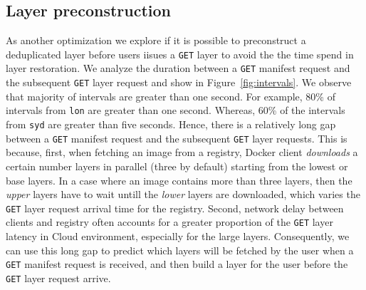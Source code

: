 \subsection{Layer preconstruction}

%
As another optimization we explore if it is possible to preconstruct a 
deduplicated layer before users iisues a \texttt{GET} layer to avoid the
the time spend in layer restoration.
%
We analyze the duration between a \texttt{GET} manifest request and the subsequent
\texttt{GET} layer request and show in Figure~\ref{fig:intervals}.
%
We observe that majority of intervals are greater than one second.
%
For example, 80\% of intervals from \texttt{lon} are greater than one second.
%
Whereas, 60\% of the intervals from \texttt{syd} are greater than five seconds. 
%
Hence, there is a relatively long gap
between a \texttt{GET} manifest request and the subsequent \texttt{GET}
layer requests.
%
This is because, first, when fetching an image from a registry,
Docker client \emph{downloads} a certain number layers in parallel (three by
default) starting from the lowest or base layers.
%
In a case where an image
contains more than three layers, then the \emph{upper} layers have to wait untill the
\emph{lower} layers are downloaded, which varies the \texttt{GET} layer request
arrival time for the registry.
%
Second, network delay between clients and registry
often accounts for a greater proportion of the \texttt{GET} layer latency in Cloud
environment, especially for the large layers.
%
Consequently, we can use this long
gap to predict which layers will be fetched by the user when a \texttt{GET}
manifest request is received, and then build a layer for the user before
the \texttt{GET} layer request arrive.


